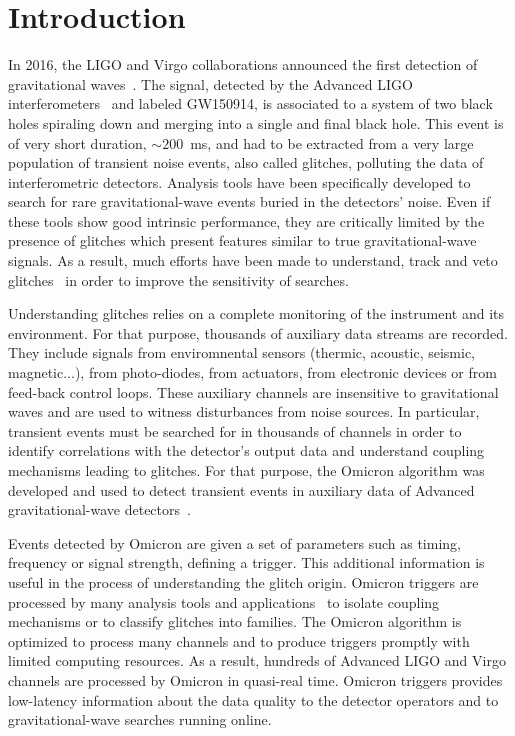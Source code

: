 \section{Introduction} \label{sec:introduction}
In 2016, the LIGO and Virgo collaborations announced the first detection of gravitational waves~\cite{Abbott:2016blz}. The signal, detected by the Advanced LIGO interferometers~\cite{Abramovici:1992ah} and labeled GW150914, is associated to a system of two black holes spiraling down and merging into a single and final black hole. This event is of very short duration, $\sim200$~ms, and had to be extracted from a very large population of transient noise events, also called glitches, polluting the data of interferometric detectors. Analysis tools have been specifically developed to search for rare gravitational-wave events buried in the detectors' noise. Even if these tools show good intrinsic performance, they are critically limited by the presence of glitches which present features similar to true gravitational-wave signals. As a result, much efforts have been made to understand, track and veto glitches~\cite{Aasi:2012wd,Aasi:2014mqd,TheLIGOScientific:2016zmo} in order to improve the sensitivity of searches.

Understanding glitches relies on a complete monitoring of the instrument and its environment. For that purpose, thousands of auxiliary data streams are recorded. They include signals from enviromnental sensors (thermic, acoustic, seismic, magnetic...), from photo-diodes, from actuators, from electronic devices or from feed-back control loops. These auxiliary channels are insensitive to gravitational waves and are used to witness disturbances from noise sources. In particular, transient events must be searched for in thousands of channels in order to identify correlations with the detector's output data and understand coupling mechanisms leading to glitches. For that purpose, the Omicron algorithm was developed and used to detect transient events in auxiliary data of Advanced gravitational-wave detectors~\cite{Nuttall:2015dqa,TheLIGOScientific:2016zmo}.

Events detected by Omicron are given a set of parameters such as timing, frequency or signal strength, defining a trigger. This additional information is useful in the process of understanding the glitch origin. Omicron triggers are processed by many analysis tools and applications~\cite{Isogai:2010zz,Smith:2011an,gspy} to isolate coupling mechanisms or to classify glitches into families. The Omicron algorithm is optimized to process many channels and to produce triggers promptly with limited computing resources. As a result, hundreds of Advanced LIGO and Virgo channels are processed by Omicron in quasi-real time. Omicron triggers provides low-latency information about the data quality to the detector operators and to gravitational-wave searches running online.


